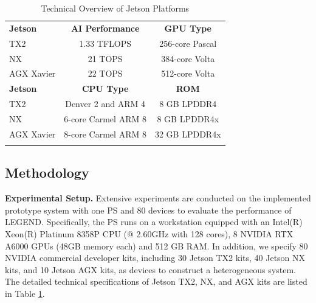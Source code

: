 \begin{table}[!t]
    \caption{Technical Overview of Jetson Platforms}
    \centering
    \begin{tabular}{lcc}
        \Xhline{1pt}
        \textbf{Jetson} & \textbf{AI Performance} & \textbf{GPU Type} \\ 
        \Xhline{0.7pt}
        TX2 & 1.33 TFLOPS & 256-core Pascal \\ \hline
        NX & 21 TOPS & 384-core Volta\\ \hline
        AGX Xavier & 22 TOPS &   512-core Volta \\ \hline
        \Xhline{1pt}
        \textbf{Jetson} & \textbf{CPU Type} & \textbf{ROM} \\ 
        \Xhline{0.7pt}
        TX2 & Denver 2 and ARM 4 & 8 GB LPDDR4\\ \hline
        NX & 6-core Carmel ARM 8 & 8 GB LPDDR4x\\ \hline
        AGX Xavier& 8-core Carmel ARM 8 & 32 GB LPDDR4x \\ \hline
        \Xhline{1pt}
    \end{tabular}
    \label{jetson-info}
    \vspace{-0.5cm}
\end{table}

\vspace{-0.2cm}
\subsection{Methodology}
\vspace{-0.1cm}
\label{evaluation}
\textbf{Experimental Setup.}
Extensive experiments are conducted on the implemented prototype system with one PS and 80 devices to evaluate the performance of LEGEND.
Specifically, the PS runs on a workstation equipped with an Intel(R) Xeon(R) Platinum 8358P CPU (@ 2.60GHz with 128 cores), 8 NVIDIA RTX A6000 GPUs (48GB memory each) and 512 GB RAM.
In addition, we specify 80 NVIDIA commercial developer kits, including 30 Jetson TX2 kits, 40 Jetson NX kits, and 10 Jetson AGX kits, as devices to construct a heterogeneous system. 
The detailed technical specifications of Jetson TX2, NX, and AGX kits are listed in Table \ref{jetson-info}.

